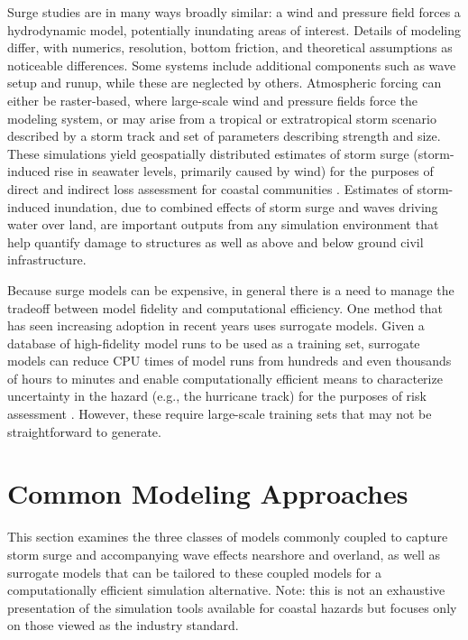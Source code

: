 Surge studies are in many ways broadly similar: a wind and pressure field forces a hydrodynamic model, potentially inundating areas of interest. Details of modeling differ, with numerics, resolution, bottom friction, and theoretical assumptions as noticeable differences. Some systems include additional components such as wave setup and runup, while these are neglected by others. Atmospheric forcing can either be raster-based, where large-scale wind and pressure fields force the modeling system, or may arise from a tropical or extratropical storm scenario described by a storm track and set of parameters describing strength and size. These simulations yield geospatially distributed estimates of storm surge (storm-induced rise in seawater levels, primarily caused by wind) for the purposes of direct and indirect loss assessment for coastal communities \citep{jacobResponding2011}. Estimates of storm-induced inundation, due to combined effects of storm surge and waves driving water over land, are important outputs from any simulation environment that help quantify damage to structures as well as above and below ground civil infrastructure.

Because surge models can be expensive, in general there is a need to manage the tradeoff between model fidelity and computational efficiency. One method that has seen increasing adoption in recent years uses surrogate models. Given a database of high-fidelity model runs to be used as a training set, surrogate models can reduce CPU times of model runs from hundreds and even thousands of hours to minutes and enable computationally efficient means to characterize uncertainty in the hazard (e.g., the hurricane track) for the purposes of risk assessment \citep{kijewski-correaCyberEye2014}. However, these require large-scale training sets that may not be straightforward to generate. 

\section{Common Modeling Approaches}
\label{sec:storm_surge_methods}

This section examines the three classes of models commonly coupled to capture storm surge and accompanying wave effects nearshore and overland, as well as surrogate models that can be tailored to these coupled models for a computationally efficient simulation alternative. Note: this is not an exhaustive presentation of the simulation tools available for coastal hazards but focuses only on those viewed as the industry standard. 


